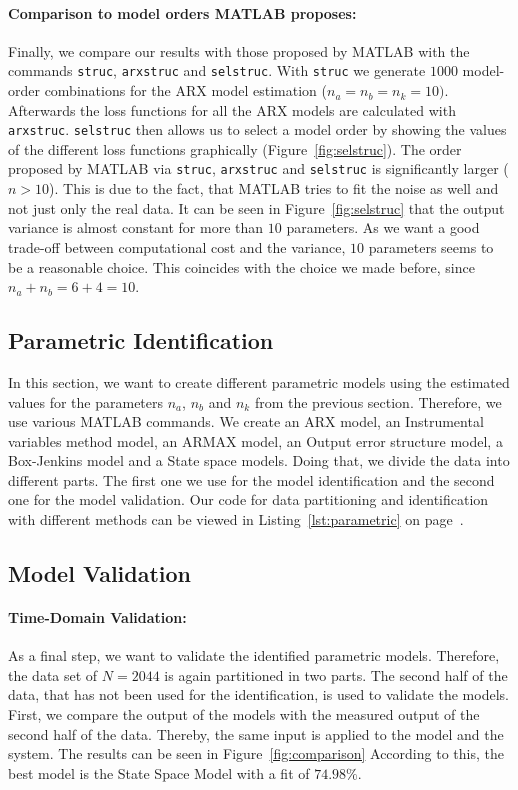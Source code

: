 \paragraph{Comparison to model orders MATLAB proposes:} Finally, we compare our results with those proposed by MATLAB with the commands \texttt{struc}, \texttt{arxstruc} and \texttt{selstruc}. 
With \texttt{struc} we generate $1000$ model-order combinations for the ARX model estimation ($n_a = n_b = n_k = 10)$. Afterwards the loss functions for all the ARX models are calculated with \texttt{arxstruc}. \texttt{selstruc} then allows us to select a model order by showing the values of the different loss functions graphically (Figure~\ref{fig:selstruc}). 
The order proposed by MATLAB via \texttt{struc}, \texttt{arxstruc} and \texttt{selstruc} is significantly larger ($n > 10$). 
This is due to the fact, that MATLAB tries to fit the noise as well and not just only the real data. 
It can be seen in Figure~\ref{fig:selstruc} that the output variance is almost constant for more than $10$ parameters.
As we want a good trade-off between computational cost and the variance, $10$ parameters seems to be a reasonable choice.
This coincides with the choice we made before, since $n_a + n_b = 6 + 4 = 10$. 

\subsection{Parametric Identification}
In this section, we want to create different parametric models using the estimated values for the parameters $n_a$, $n_b$ and $n_k$ from the previous section. 
Therefore, we use various MATLAB commands. 
We create an ARX model, an Instrumental variables method model, an ARMAX model, an Output error structure model, a Box-Jenkins model and a State space models.
Doing that, we divide the data into different parts. 
The first one we use for the model identification and the second one for the model validation. 
Our code for data partitioning and identification with different methods can be viewed in Listing~\ref{lst:parametric} on page~\pageref{lst:parametric}.

\subsection{Model Validation}

\paragraph{Time-Domain Validation:}
As a final step, we want to validate the identified parametric models. Therefore, the data set of $N = 2044$ is again partitioned in two parts. 
The second half of the data, that has not been used for the identification, is used to validate the models. 
First, we compare the output of the models with the measured output of the second half of the data.  
Thereby, the same input is applied to the model and the system. 
The results can be seen in Figure~\ref{fig:comparison}
According to this, the best model is the State Space Model with a fit of $74.98 \% $.

